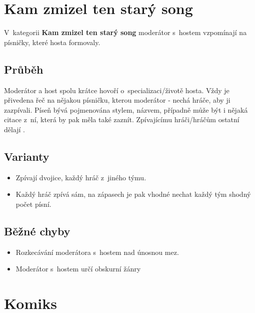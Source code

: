  
 
 
 
\needspace{5cm} \section{Kam zmizel ten starý song} \label{kam zmizel ten starý song}  
 
 
V~kategorii \textbf{Kam zmizel ten starý song} moderátor s~hostem vzpomínají na písničky, které hosta formovaly. 
 
 
\subsection{Průběh} Moderátor a host spolu krátce hovoří o~specializaci/životě hosta. 
Vždy je přivedena řeč na nějakou písničku, kterou moderátor   - nechá hráče, aby ji zazpívali. 
Píseň bývá pojmenována stylem, názvem, případně může být i nějaká citace z~ní, která by pak měla také zaznít. 
Zpívajícímu hráči/hráčům ostatní dělají . 
 
\subsection{ Varianty } \begin{itemize}
\item Zpívají dvojice, každý hráč z~jiného týmu.
\item Každý hráč zpívá sám, na zápasech je pak vhodné nechat každý tým shodný počet písní.
\end{itemize}
  
 
\subsection{ Běžné chyby } \begin{itemize}
\item Rozkecávání moderátora s~hostem nad únosnou mez.
\item Moderátor s~hostem určí obskurní žánry
\end{itemize}
 
 
 
 
 
\needspace{5cm} \section{Komiks} \label{komiks}  
 
